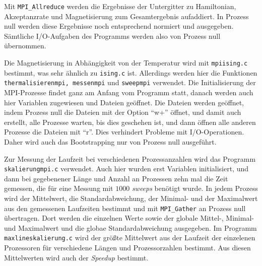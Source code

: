 	Mit \texttt{MPI\_Allreduce} werden die Ergebnisse der Untergitter zu Hamiltonian, Akzeptanzrate und Magnetisierung zum Gesamtergebnis aufaddiert. In Prozess null werden diese Ergebnisse noch entsprechend normiert und ausgegeben. Sämtliche I/O-Aufgaben des Programms werden also von Prozess null übernommen.
	
	Die Magnetisierung in Abhängigkeit von der Temperatur wird mit \texttt{mpiising.c} bestimmt, was sehr ähnlich zu \texttt{ising.c} ist. Allerdings werden hier die Funktionen \texttt{thermalisierenmpi, messenmpi} und \texttt{sweepmpi} verwendet. 
	Die Initialisierung der MPI-Prozesse findet ganz am Anfang vom Programm statt, danach werden auch hier Variablen zugewiesen und Dateien geöffnet. Die Dateien werden geöffnet, indem Prozess null die Dateien mit der Option \enquote{w+} öffnet, und damit auch erstellt, alle Prozesse warten, bis dies geschehen ist, und dann öffnen alle anderen Prozesse die Dateien mit \enquote{r}. Dies verhindert Probleme mit I/O-Operationen. Daher wird auch das Bootstrapping nur von Prozess null ausgeführt.
	
	Zur Messung der Laufzeit bei verschiedenen Prozessanzahlen wird das Programm \texttt{skalierungmpi.c} verwendet. Auch hier wurden erst Variablen initialisiert, und dann bei gegebenener Länge und Anzahl an Prozessen zehn mal die Zeit gemessen, die für eine Messung mit $1000$ \textit{sweeps} benötigt wurde. In jedem Prozess wird der Mittelwert, die Standardabweichung, der Minimal- und der Maximalwert aus den gemessenen Laufzeiten bestimmt und mit \texttt{MPI\_Gather} an Prozess null übertragen. Dort werden die einzelnen Werte sowie der globale Mittel-, Minimal- und Maximalwert und die globae Standardabweichung ausgegeben. Im Programm \texttt{maxlineskalierung.c} wird der größte Mittelwert aus der Laufzeit der einzelenen Prozessoren für verschiedene Längen und Prozessorzahlen bestimmt. Aus diesen Mittelwerten wird auch der \textit{Speedup} bestimmt.  
%	


	
